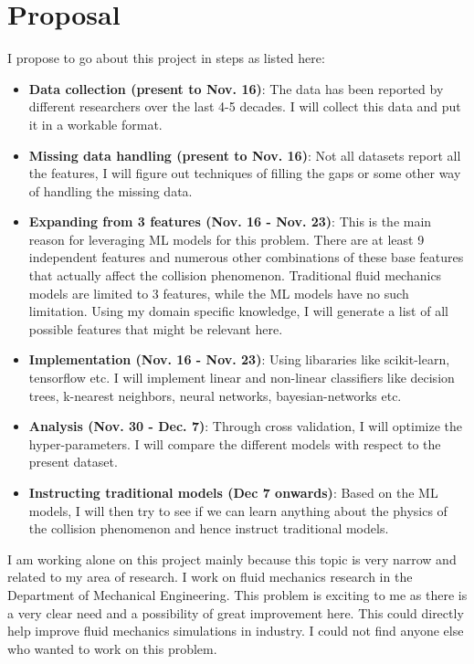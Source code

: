 \documentclass{article}
\begin{document}
\section{Proposal}
\label{sec:proposal}
I propose to go about this project in steps as listed here:
\begin{itemize}
\item \textbf{Data collection (present to Nov. 16)}: The data has been reported by different researchers over the last 4-5 decades. I will collect this data and put it in a workable format.
\item \textbf{Missing data handling (present to Nov. 16)}: Not all datasets report all the features, I will figure out techniques of filling the gaps or some other way of handling the missing data.
\item \textbf{Expanding from 3 features (Nov. 16 - Nov. 23)}: This is the main reason for leveraging ML models for this problem. There are at least 9 independent features and numerous other combinations of these base features that actually affect the collision phenomenon. Traditional fluid mechanics models are limited to 3 features, while the ML models have no such limitation. Using my domain specific knowledge, I will generate a list of all possible features that might be relevant here.
\item \textbf{Implementation (Nov. 16 - Nov. 23)}: Using libararies like scikit-learn, tensorflow etc. I will implement linear and non-linear classifiers like decision trees, k-nearest neighbors, neural networks, bayesian-networks etc.
\item \textbf{Analysis (Nov. 30 - Dec. 7)}: Through cross validation, I will optimize the hyper-parameters. I will compare the different models with respect to the present dataset.
\item \textbf{Instructing traditional models (Dec 7 onwards)}: Based on the ML models, I will then try to see if we can learn anything about the physics of the collision phenomenon and hence instruct traditional models.
\end{itemize}

I am working alone on this project mainly because this topic is very narrow and related to my area of research. I work on fluid mechanics research in the Department of Mechanical Engineering. This problem is exciting to me as there is a very clear need and a possibility of great improvement here. This could directly help improve fluid mechanics simulations in industry. I could not find anyone else who wanted to work on this problem.
\end{document}
